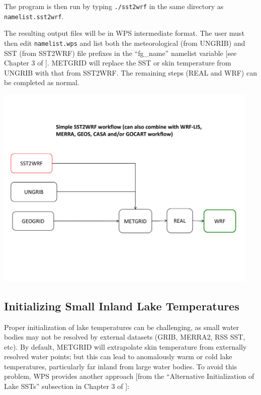 The program is then run by typing \texttt{./sst2wrf} in the same directory
as \texttt{namelist.sst2wrf}. 

The resulting output files will be in WPS intermediate format. The user must 
then edit \texttt{namelist.wps} and list both the meteorological (from UNGRIB)
and SST (from SST2WRF) file prefixes in the ``fg\_name'' namelist variable 
[see Chapter 3 of \cite{ref:ArwUserGuide}]. METGRID will replace the SST
or skin temperature from UNGRIB with that from SST2WRF. The remaining
steps (REAL and WRF) can be completed as normal.

\centerline{\includegraphics[width=5in]{SST2WRF_workflow}}

\subsection{Initializing Small Inland Lake Temperatures}
\label{subsec:InitLakeTemps}

Proper initialization of lake temperatures can be challenging, as small water
bodies may not be resolved by external datasets (GRIB, MERRA2, RSS SST, etc).
By default, METGRID will extrapolate skin temperature from externally resolved
water points; but this can lead to anomalously warm or cold lake temperatures,
particularly far inland from large water bodies.  To avoid this problem, WPS
provides another approach [from the ``Alternative Initialization of Lake SSTs''
subsection in Chapter 3 of \cite{ref:ArwUserGuide}]:

